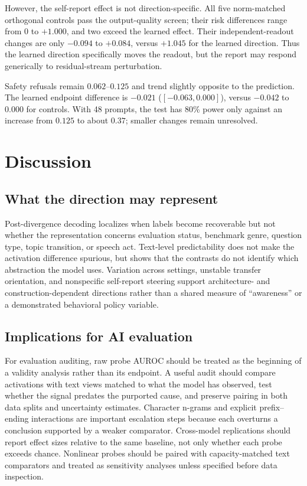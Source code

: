 \documentclass{article}
\begin{document}
However, the self-report effect is not direction-specific. All five
norm-matched orthogonal controls pass the output-quality screen; their risk
differences range from $0$ to $+1.000$, and two exceed the learned effect. Their
independent-readout changes are only $-0.094$ to $+0.084$, versus $+1.045$ for
the learned direction. Thus the learned direction specifically moves the
readout, but the report may respond generically to residual-stream perturbation.

Safety refusals remain $0.062$--$0.125$ and trend slightly opposite to the
prediction. The learned endpoint difference is $-0.021$ ($[-0.063,0.000]$),
versus $-0.042$ to $0.000$ for controls. With 48 prompts, the test has 80\%
power only against an increase from $0.125$ to about $0.37$; smaller changes
remain unresolved.

\FloatBarrier
\section{Discussion}

\subsection{What the direction may represent}

Post-divergence decoding localizes when labels become recoverable but not whether
the representation concerns evaluation status, benchmark genre, question type,
topic transition, or speech act. Text-level predictability does not make the
activation difference spurious, but shows that the contrasts do not identify
which abstraction the model uses. Variation across settings, unstable transfer
orientation, and nonspecific self-report steering support architecture- and
construction-dependent directions rather than a shared measure of ``awareness''
or a demonstrated behavioral policy variable.

\subsection{Implications for AI evaluation}

For evaluation auditing, raw probe AUROC should be treated as the beginning of
a validity analysis rather than its endpoint. A useful audit should compare
activations with text views matched to what the model has observed, test whether
the signal predates the purported cause, and preserve pairing in both data
splits and uncertainty estimates. Character n-grams and explicit
prefix--ending interactions are important escalation steps because each
overturns a conclusion supported by a weaker comparator. Cross-model
replications should report effect sizes relative to the same baseline, not only
whether each probe exceeds chance. Nonlinear probes should be paired with
capacity-matched text comparators and treated as sensitivity analyses unless
specified before data inspection.
\end{document}

